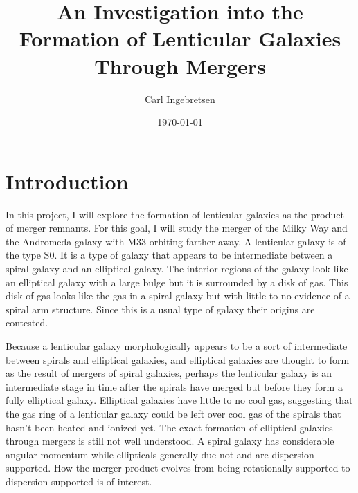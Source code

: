 \documentclass[%
 reprint,
 amsmath,amssymb,
 aps,
]{revtex4-2}
\begin{document}

\title{An Investigation into the Formation of Lenticular Galaxies Through Mergers}%


\author{Carl Ingebretsen}

\date{\today}%


\maketitle


\section{\label{sec:level1}Introduction}
In this project, I will explore the formation of lenticular galaxies as the product of merger remnants. For this goal, I will study the merger of the Milky Way and the Andromeda galaxy with M33 orbiting farther away. A lenticular galaxy is of the type S0. It is a type of galaxy that appears to be intermediate between a spiral galaxy and an elliptical galaxy. The interior regions of the galaxy look like an elliptical galaxy with a large bulge but it is surrounded by a disk of gas. This disk of gas looks like the gas in a spiral galaxy but with little to no evidence of a spiral arm structure. Since this is a usual type of galaxy their origins are contested\citep{Querejeta_2015}.

Because a lenticular galaxy morphologically appears to be a sort of intermediate between spirals and elliptical galaxies, and elliptical galaxies are thought to form as the result of mergers of spiral galaxies, perhaps the lenticular galaxy is an intermediate stage in time after the spirals have merged but before they form a fully elliptical galaxy\citep{Cox_2006}. Elliptical galaxies have little to no cool gas, suggesting that the gas ring of a lenticular galaxy could be left over cool gas of the spirals that hasn’t been heated and ionized yet. The exact formation of elliptical galaxies through mergers is still not well understood. A spiral galaxy has considerable angular momentum while ellipticals generally due not and are dispersion supported\citep{Cox_2006}. How the merger product evolves from being rotationally supported to dispersion supported is of interest.
\end{document}
